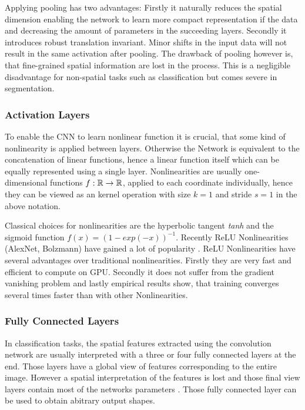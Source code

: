 Applying pooling has two  advantages: Firstly it naturally reduces the spatial dimension enabling the network to learn more compact representation if the data and decreasing the amount of parameters in the succeeding layers. Secondly it introduces robust translation invariant. Minor shifts in the input data will not result in the same activation after pooling. The drawback of pooling however is, that fine-grained spatial information are lost in the process. This is a negligible disadvantage for non-spatial tasks such as classification but comes severe in segmentation. 

 \subsubsection{Activation Layers}
 
 To enable the CNN to learn nonlinear function it is crucial, that some kind of nonlinearity is applied between layers. Otherwise the Network is equivalent to the concatenation of linear functions, hence a linear function itself which can be equally represented using a single layer. Nonlinearities are usually one-dimensional functions $f: \mathbb{R} \rightarrow \mathbb{R}$, applied to each coordinate individually, hence they can be viewed as an kernel operation with size $k=1$ and stride $s=1$ in the above notation. 
 
Classical choices for nonlinearities are the hyperbolic tangent \emph{tanh} and the sigmoid function $f(x) = (1- exp(-x))^{-1}$. Recently ReLU Nonlinearities \cite{AlexNet}(AlexNet, Bolzmann) have gained a lot of popularity \cite{AlexNet,VGG16,googLeNeT}. ReLU Nonlinearities have several advantages over traditional nonlinearities. Firstly they are very fast and efficient to compute on GPU. Secondly it does not suffer from the gradient vanishing problem and lastly empirical results show, that training converges several times faster than with other Nonlinearities.

\subsubsection{Fully Connected Layers} 

In classification tasks, the spatial features extracted using the convolution network are usually interpreted with a three or four fully connected layers at the end. Those layers have a global view of features corresponding to the entire image. However a spatial interpretation of the features is lost and those final view layers contain most of the networks parameters \cite{AlexNet}. Those fully connected layer can be used to obtain abitrary output shapes. 

